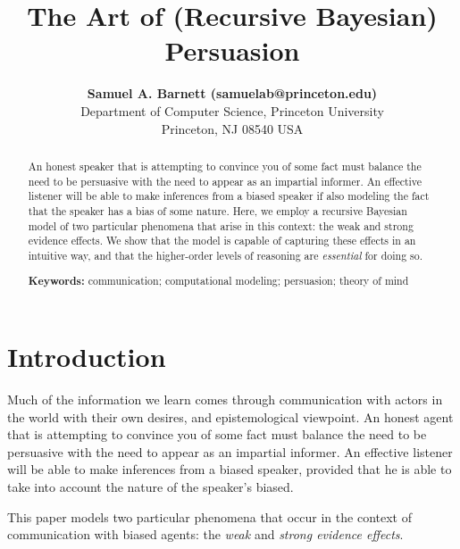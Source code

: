 \documentclass[10pt,letterpaper]{article}
\title{The Art of (Recursive Bayesian) Persuasion}
\author{{\large \bf Samuel A. Barnett (samuelab@princeton.edu)} \\
  Department of Computer Science, Princeton University \\
  Princeton, NJ 08540 USA}
\begin{document}
\maketitle


\begin{abstract}
An honest speaker that is attempting to convince you of some fact must balance
the need to be persuasive with the need to appear as an impartial informer. An effective listener
will be able to make inferences from a biased speaker if also modeling the fact that
the speaker has a bias of some nature. Here, we employ a recursive Bayesian model
of two particular phenomena that arise in this context: the weak and strong evidence effects.
We show that the model is capable of capturing these effects in an intuitive way, and that the
higher-order levels of reasoning are \textit{essential} for doing so.

\textbf{Keywords:} 
communication; computational modeling; persuasion; theory of mind
\end{abstract}

\section{Introduction}
\begin{epigraphs}
\end{epigraphs}

Much of the information we learn comes through communication with actors 
in the world with their own desires, and epistemological viewpoint. An honest agent 
that is attempting to convince you of some fact must balance the need to be persuasive 
with the need to appear as an impartial informer. An effective listener will be able to 
make inferences from a biased speaker, provided that he is able to take into account the
nature of the speaker's biased.

This paper models two particular phenomena that occur in the context of communication
with biased agents: the \textit{weak} and \textit{strong evidence effects}. 
\end{document}
